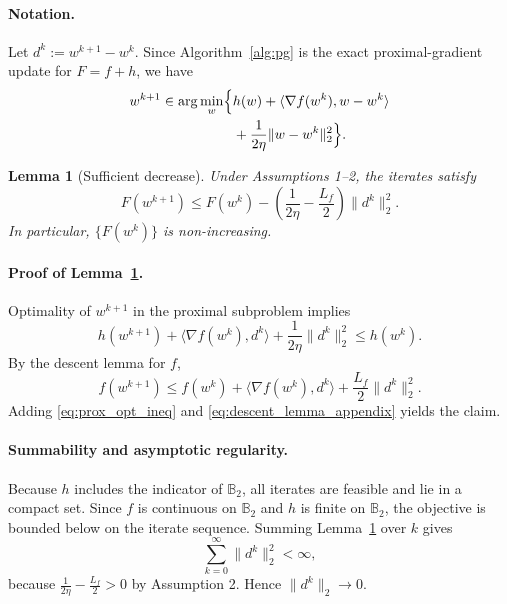 \documentclass[10pt,twocolumn,letterpaper]{article}
\newtheorem{lemma}{Lemma}
\theoremstyle{definition}
\begin{document}
\paragraph{Notation.}
Let $d^k:=w^{k+1}-w^k$. Since Algorithm~\ref{alg:pg} is the exact proximal-gradient update for $F=f+h$, we have
\begin{equation}
\begin{aligned}
w^{k+1}\in \arg\min_{w}\Bigl\{ & h(w)+\langle \nabla f(w^k), w-w^k\rangle \\
& + \frac{1}{2\eta}\|w-w^k\|_2^2 \Bigr\}.
\end{aligned}
\end{equation}

\begin{lemma}[Sufficient decrease]
\label{lem:sufficient_decrease}
Under Assumptions 1--2, the iterates satisfy
\begin{equation}
F(w^{k+1}) \le F(w^k) - \left(\frac{1}{2\eta}-\frac{L_f}{2}\right)\|d^k\|_2^2.
\end{equation}
In particular, $\{F(w^k)\}$ is non-increasing.
\end{lemma}

\paragraph{Proof of Lemma~\ref{lem:sufficient_decrease}.}
Optimality of $w^{k+1}$ in the proximal subproblem implies
\begin{equation}
h(w^{k+1}) + \langle \nabla f(w^k), d^k\rangle + \frac{1}{2\eta}\|d^k\|_2^2 \le h(w^k).
\label{eq:prox_opt_ineq}
\end{equation}
By the descent lemma for $f$,
\begin{equation}
f(w^{k+1}) \le f(w^k)+\langle \nabla f(w^k), d^k\rangle + \frac{L_f}{2}\|d^k\|_2^2.
\label{eq:descent_lemma_appendix}
\end{equation}
Adding \eqref{eq:prox_opt_ineq} and \eqref{eq:descent_lemma_appendix} yields the claim.

\paragraph{Summability and asymptotic regularity.}
Because $h$ includes the indicator of $\mathbb{B}_2$, all iterates are feasible and lie in a compact set. Since $f$ is continuous on $\mathbb{B}_2$ and $h$ is finite on $\mathbb{B}_2$, the objective is bounded below on the iterate sequence. Summing Lemma~\ref{lem:sufficient_decrease} over $k$ gives
\begin{equation}
\sum_{k=0}^\infty \|d^k\|_2^2 < \infty,
\end{equation}
because $\frac{1}{2\eta}-\frac{L_f}{2}>0$ by Assumption 2. Hence $\|d^k\|_2\to 0$.
\end{document}

